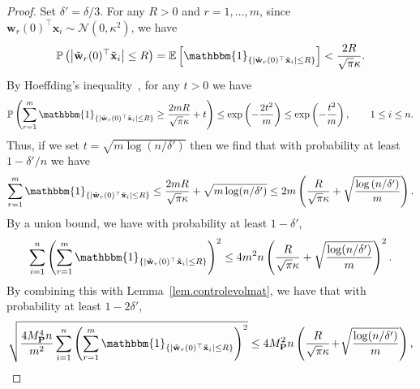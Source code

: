 \begin{proof}
Set $\delta' = \delta / 3$. For any $R > 0$ and $r = 1, \ldots, m$, since ${\mathbf{w}_r}(0)^\top {\mathbf{x}}_i \sim \mathcal{N}(0,\kappa^2)$, we have
\begin{equation*}
   \mathbb{P} \left(\abs{\tilde{\mathbf{w}}_r(0)^\top \tilde{\mathbf{x}}_i} \leq R \right) =  \E\left[\mathbbm{1}_{\left\{\abs{\tilde{\mathbf{w}}_r(0)^\top \tilde{\mathbf{x}}_i} \leq R\right\}}\right] < \frac{2R}{\sqrt{\pi}\kappa}.
\end{equation*}
By Hoeffding's inequality~\citep{hoeffding1994}, for any $t > 0$ we have
\begin{equation}
    \mathbb{P}\left(\sum_{r=1}^m \mathbbm{1}_{\left\{\abs{\tilde{\mathbf{w}}_r(0)^\top \tilde{\mathbf{x}}_i} \leq R\right\}} \geq \frac{2mR}{\sqrt{\pi}\kappa} + t\right) \leq \text{exp}\left(-\frac{2t^2}{m}\right) \leq \text{exp}\left(-\frac{t^2}{m}\right), \qquad 1\leq i\leq n. 
\end{equation}
Thus, if we set $t = \sqrt{m\log(n/\delta')}$ then we find that with probability at least $1 - \delta'/n$ we have
\begin{equation*}
    \sum_{r=1}^m \mathbbm{1}_{\left\{\abs{\tilde{\mathbf{w}}_r(0)^\top \tilde{\mathbf{x}}_i} \leq R\right\}} \leq \frac{2mR}{\sqrt{\pi}\kappa} + \sqrt{m\log(n/\delta')} \leq 2m\left(\frac{R}{\sqrt{\pi}\kappa} + \sqrt{\frac{\log\left(n/\delta'\right)}{m}}\right).
\end{equation*}
By a union bound, we have with probability at least $1 - \delta'$,
\begin{equation*}
    \sum_{i=1}^n \left(\sum_{r=1}^m \mathbbm{1}_{\left\{\abs{\tilde{\mathbf{w}}_r(0)^\top \tilde{\mathbf{x}}_i} \leq R\right\}}\right)^2 \leq 4m^2 n \left(\frac{R}{\sqrt{\pi}\kappa} + \sqrt{\frac{\log(n/\delta')}{m}}\right)^2.
\end{equation*}
By combining this with Lemma~\ref{lem.controlevolmat}, we have that with probability at least $1 - 2\delta'$,
\begin{equation} 
    \sqrt{\frac{4 M_{\mathbf{P}}^4 n}{m^2} \sum_{i=1}^n \left(\sum_{r=1}^m \mathbbm{1}_{\left\{\abs{\tilde{\mathbf{w}}_r(0)^\top \tilde{\mathbf{x}}_i} \leq R\right\}}\right)^2} \leq 4 M_{\mathbf{P}}^2 n \left(\frac{R}{\sqrt{\pi}\kappa} \!+\! \sqrt{\frac{\log(n/\delta')}{m}}\right), \label{eq.Rdist}
\end{equation} 

\end{proof}
